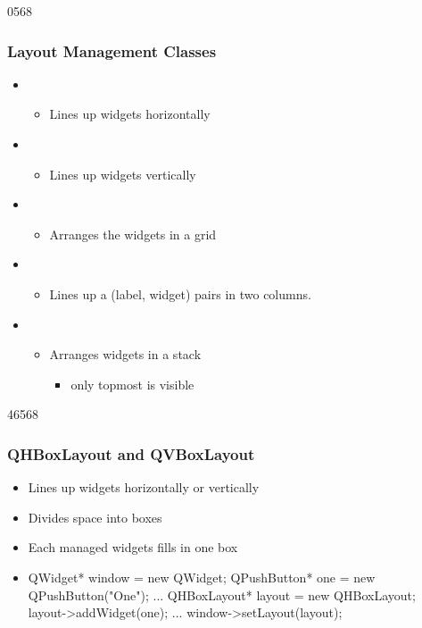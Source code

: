 \begin{slide}{0568}\frametitle{Layout Management Classes}
\begin{itemize} 
\item {} 
  \begin{itemize}
  \item Lines up widgets horizontally 
  \end{itemize}
\item {}
  \begin{itemize}
  \item Lines up widgets vertically
  \end{itemize}
\item {} 
  \begin{itemize}
  \item Arranges the widgets in a grid
  \end{itemize}
\item {} 
  \begin{itemize}
  \item Lines up a (label, widget) pairs in two columns.
  \end{itemize}
\item {} 
  \begin{itemize}
  \item Arranges widgets in a stack
    \begin{itemize}
	    \item only topmost is visible
  \end{itemize}
\end{itemize}
\end{itemize}
\end{slide}


\begin{slide}[fragile]{46568}
  \frametitle{QHBoxLayout and QVBoxLayout}
  \begin{itemize}
  \item Lines up widgets horizontally or vertically
  \item Divides space into boxes
  \item Each managed widgets fills in one box
  \end{itemize}
  \begin{itemize}
  \item[] \begin{cpp}
QWidget* window = new QWidget;
QPushButton* one = new QPushButton("One");
...
QHBoxLayout* layout = new QHBoxLayout;
layout->addWidget(one);
...
window->setLayout(layout);
  \end{cpp}               
  \end{itemize}
\end{slide}

